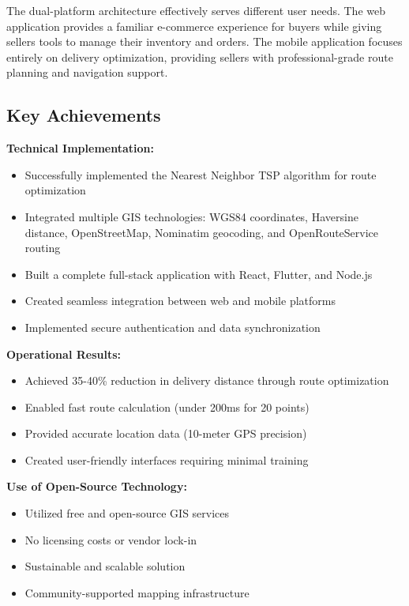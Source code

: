 \documentclass[12pt,a4paper]{article}
\begin{document}
The dual-platform architecture effectively serves different user needs. The web application provides a familiar e-commerce experience for buyers while giving sellers tools to manage their inventory and orders. The mobile application focuses entirely on delivery optimization, providing sellers with professional-grade route planning and navigation support.

\subsection{Key Achievements}

\textbf{Technical Implementation:}
\begin{itemize}
    \item Successfully implemented the Nearest Neighbor TSP algorithm for route optimization
    \item Integrated multiple GIS technologies: WGS84 coordinates, Haversine distance, OpenStreetMap, Nominatim geocoding, and OpenRouteService routing
    \item Built a complete full-stack application with React, Flutter, and Node.js
    \item Created seamless integration between web and mobile platforms
    \item Implemented secure authentication and data synchronization
\end{itemize}

\textbf{Operational Results:}
\begin{itemize}
    \item Achieved 35-40\% reduction in delivery distance through route optimization
    \item Enabled fast route calculation (under 200ms for 20 points)
    \item Provided accurate location data (10-meter GPS precision)
    \item Created user-friendly interfaces requiring minimal training
\end{itemize}

\textbf{Use of Open-Source Technology:}
\begin{itemize}
    \item Utilized free and open-source GIS services
    \item No licensing costs or vendor lock-in
    \item Sustainable and scalable solution
    \item Community-supported mapping infrastructure
\end{itemize}
\end{document}
